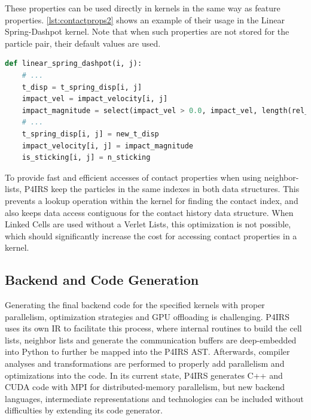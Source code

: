 \documentclass[Afour,sageh,times]{sagej}
\begin{document}
These properties can be used directly in kernels in the same way as feature properties.
\autoref{lst:contactprops2} shows an example of their usage in the Linear Spring-Dashpot kernel.
Note that when such properties are not stored for the particle pair, their default values are used.

\begin{lstlisting}[language=Python,
		   label={lst:contactprops2},
		   caption={Contact properties usage example.}]
def linear_spring_dashpot(i, j):
    # ...
    t_disp = t_spring_disp[i, j]
    impact_vel = impact_velocity[i, j]
    impact_magnitude = select(impact_vel > 0.0, impact_vel, length(rel_vel))
    # ...
    t_spring_disp[i, j] = new_t_disp
    impact_velocity[i, j] = impact_magnitude
    is_sticking[i, j] = n_sticking
\end{lstlisting}

To provide fast and efficient accesses of contact properties when using neighbor-lists, P4IRS keep the particles in the same indexes in both data structures.
This prevents a lookup operation within the kernel for finding the contact index, and also keeps data access contiguous for the contact history data structure.
When Linked Cells are used without a Verlet Lists, this optimization is not possible, which should significantly increase the cost for accessing contact properties in a kernel.

\subsection{Backend and Code Generation}
\label{sec:backend}

Generating the final backend code for the specified kernels with proper parallelism, optimization strategies and GPU offloading is challenging.
P4IRS uses its own \ac{IR} to facilitate this process, where internal routines to build the cell lists, neighbor lists and generate the communication buffers are deep-embedded into Python to further be mapped into the P4IRS \ac{AST}.
Afterwards, compiler analyses and transformations are performed to properly add parallelism and optimizations into the code.
In its current state, P4IRS generates C++ and CUDA code with MPI for distributed-memory parallelism, but new backend languages, intermediate representations and technologies can be included without difficulties by extending its code generator.
\end{document}
